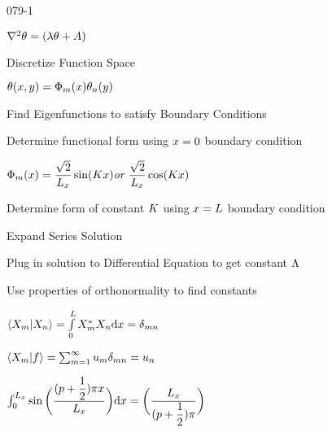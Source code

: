 \begin{mitframe}{079-1}
 \begin{listone}
	\item $\nabla^2\theta=(\wavel\theta+\helmholtz)$
    	\begin{listtwo}
        	\item Discretize Function Space
            	\begin{listthree}
                	\item $\theta(\disp,y)=\pot_{\mass}(\disp)\theta_n(y)$
                \end{listthree}
            \item Find Eigenfunctions to satisfy Boundary Conditions
\item Determine functional form using $\disp=0$ boundary condition
            \begin{listthree}
            	\item $\pot_{\mass}(\disp)=\dfrac{\sqrt{2}}{\length_{\disp}}\sin(\dilfac\disp) \textit{or }\dfrac{\sqrt{2}}{\length_{\disp}}\cos(\dilfac\disp) $
            \end{listthree}
            \item Determine form of constant $\dilfac$ using $\disp=\length$ boundary condition
            \item Expand Series Solution
            \item Plug in solution to Differential Equation to get constant $\debroglie$
            \item Use properties of orthonormality to find constants
            	\begin{listthree}
                	\item $ \langle{X}_{\mass}|X_{n}\rangle=\int\limits_{\init}^{\length}X_{\mass}^*X_n\mathrm{d}\disp=\blthick_{\mass{n}}$
                    
       				\item $\langle{X}_{\mass}|\fug\rangle=\sum_{\mass=1}^{\infty}\forcepot_{\mass}\blthick_{\mass{n}}=\forcepot_n$
                    
                    \item $\int_{\init}^{\length_{\disp}}\sin\bigg(\dfrac{(p+\dfrac{1}{2})\pi\disp}{\length_{\disp}}\bigg)\mathrm{d}\disp=\bigg(\dfrac{\length_{\disp}}{(p+\dfrac{1}{2})\pi}\bigg)$
                \end{listthree}
        \end{listtwo}
\end{listone}   

\end{mitframe}
